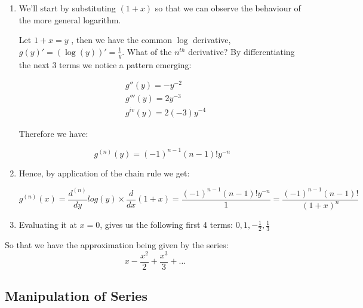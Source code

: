 \documentclass[english,course]{Notes}
\begin{document}
\begin{enumerate}
	\item We'll start by substituting $(1+x)$ so that we can observe the behaviour of the more general logarithm.
	
	Let $1 + x = y$ , then we have the common $\log$ derivative, $g(y)'=(\log(y))' = \tfrac{1}{y}$. What of the $n^{th}$ derivative? By differentiating the next 3 terms we notice a pattern emerging:
	
	\begin{align*}
		&g''(y) = -y^{-2} \\
		&g'''(y) = 2y^{-3} \\
		&g^{iv}(y) = 2(-3)y^{-4}
	\end{align*}
	
Therefore we have:

$$ g^{(n)}(y) = (-1)^{n-1}(n-1)!y^{-n} $$

	\item Hence, by application of the chain rule we get:
	
	$$ g^{(n)}(x) = \frac{d^{(n)}}{dy} log(y) \times \frac{d}{dx} (1 + x) =  \frac{(-1)^{n-1}(n-1)!y^{-n}}{1} = \frac{(-1)^{n-1}(n-1)!}{(1+x)^n}$$
	
	\item Evaluating it at $x = 0$, gives us the following first 4 terms: $ 0 , 1 , -\frac{1}{2} , \frac{1}{3}$
\end{enumerate}

\par{So that we have the approximation being given by the series: $$x - \frac{x^2}{2} + \frac{x^3}{3}  + \dots$$}

\subsection{Manipulation of Series}
\end{document}
